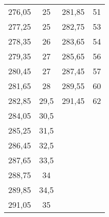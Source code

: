 \begin{longtable}{c c ||c c}
276,05 &       25   &          281,85 &       51   \\
277,25 &       25   &          282,75 &       53   \\
278,35 &       26   &          283,65 &       54   \\
279,35 &       27   &          285,65 &       56   \\
280,45 &       27   &          287,45 &       57   \\
281,65 &       28   &          289,55 &       60   \\
282,85 &       29,5 &          291,45 &       62   \\
284,05 &       30,5 &                 &            \\
285,25 &       31,5 &                 &            \\
286,45 &       32,5 &                 &            \\
287,65 &       33,5 &                 &            \\
288,75 &       34   &                 &            \\
289,85 &       34,5 &                 &            \\
291,05 &       35   &                 &            \\
\end{longtable}
